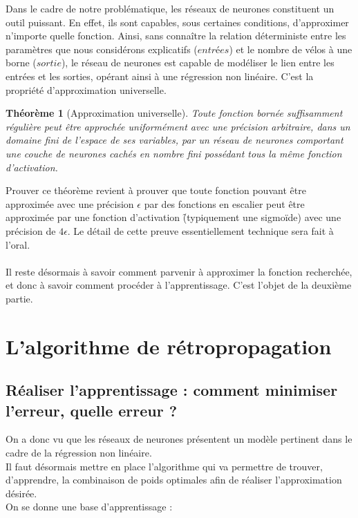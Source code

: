\documentclass[a4paper, 11pt]{article}
\begin{document}
Dans le cadre de notre problématique, les réseaux de neurones constituent un outil puissant. En effet, ils sont capables, sous certaines conditions, d'approximer n'importe quelle fonction. Ainsi, sans connaître la relation déterministe entre les paramètres que nous considérons explicatifs ($entrées$) et le nombre de vélos à une borne ($sortie$),  le réseau de neurones est capable de modéliser le lien entre les entrées et les sorties, opérant ainsi à une régression non linéaire. C'est la propriété d'approximation universelle.\\
\newtheorem{thm}{Théorème}
\begin{thm}[Approximation universelle]
Toute fonction bornée suffisamment régulière peut être approchée uniformément avec une précision arbitraire, dans un domaine fini de l'espace de ses variables, par un réseau de neurones comportant une couche de neurones cachés en nombre fini possédant tous la même fonction d'activation.
 \end{thm} 
 Prouver ce théorème revient à prouver que toute fonction pouvant être approximée avec une précision $\epsilon$ par des fonctions en escalier peut être approximée par une fonction d'activation \f (typiquement une sigmoïde) avec une précision de $4\epsilon$. Le détail de cette preuve essentiellement technique sera fait à l'oral. \\ \\
Il reste désormais à savoir comment parvenir à approximer la fonction recherchée, et donc à savoir comment procéder à l'apprentissage. C'est l'objet de la deuxième partie.



\section{L'algorithme de rétropropagation}

\subsection{Réaliser l'apprentissage : comment minimiser l'erreur, quelle erreur ?}

On a donc vu que les réseaux de neurones présentent un modèle pertinent dans le cadre de la régression non linéaire.\\
Il faut désormais mettre en place l'algorithme qui va permettre de trouver, d'apprendre, la combinaison de poids optimales afin de réaliser l'approximation désirée.\\
On se donne une base d'apprentissage :
\end{document}
